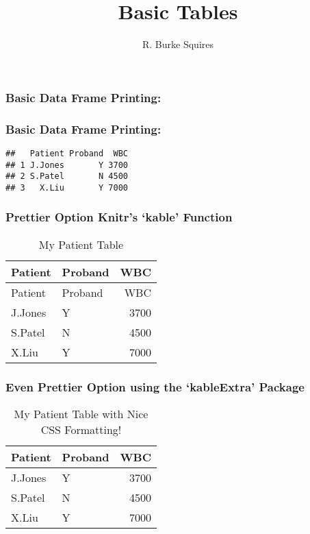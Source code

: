 \documentclass[
]{article}
\title{Basic Tables}
\author{R. Burke Squires}
\date{}
\begin{document}
\maketitle

\subsubsection{Basic Data Frame
Printing:}\label{basic-data-frame-printing}

\subsubsection{Basic Data Frame
Printing:}\label{basic-data-frame-printing-1}

\begin{verbatim}
##   Patient Proband  WBC
## 1 J.Jones       Y 3700
## 2 S.Patel       N 4500
## 3   X.Liu       Y 7000
\end{verbatim}

\subsubsection{Prettier Option Knitr's `kable'
Function}\label{prettier-option-knitrs-kable-function}

\begin{longtable}[]{@{}llr@{}}
\caption{My Patient Table}\tabularnewline
\toprule\noalign{}
Patient & Proband & WBC \\
\midrule\noalign{}
\endfirsthead
\toprule\noalign{}
Patient & Proband & WBC \\
\midrule\noalign{}
\endhead
\bottomrule\noalign{}
\endlastfoot
J.Jones & Y & 3700 \\
S.Patel & N & 4500 \\
X.Liu & Y & 7000 \\
\end{longtable}

\subsubsection{Even Prettier Option using the `kableExtra'
Package}\label{even-prettier-option-using-the-kableextra-package}

\begin{longtable}[t]{llr}
\caption{\label{tab:table-kable-extra}My Patient Table with Nice CSS Formatting!}\\
\toprule
Patient & Proband & WBC\\
\midrule
J.Jones & Y & 3700\\
S.Patel & N & 4500\\
X.Liu & Y & 7000\\
\bottomrule
\end{longtable}
\end{document}
